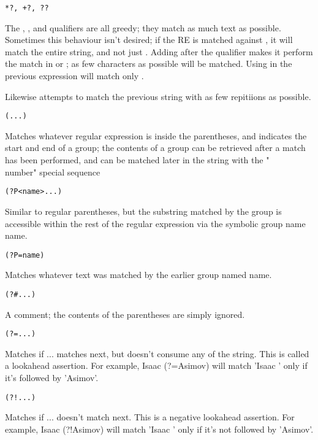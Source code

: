 \begin{lstlisting} 
*?, +?, ?? 
\end{lstlisting}
The , , and  qualifiers are all greedy; they match as much text as possible. Sometimes this behaviour isn’t desired; if the RE  is matched against , it will match the entire string, and not just . Adding  after the qualifier makes it perform the match in  or ; as few characters as possible will be matched. Using  in the previous expression will match only .

Likewise  attempts to match the previous string with as few repitiions as possible.

\begin{lstlisting}
(...)
\end{lstlisting}
Matches whatever regular expression is inside the parentheses, and indicates the start and end of a group; the contents of a group can be retrieved after a match has been performed, and can be matched later in the string with the "\\number" special sequence


\begin{lstlisting}
(?P<name>...)
\end{lstlisting}
Similar to regular parentheses, but the substring matched by the group is accessible within the rest of the regular expression via the symbolic group name name. 

\begin{lstlisting}
(?P=name)
\end{lstlisting}
Matches whatever text was matched by the earlier group named name.

\begin{lstlisting}
(?#...)
\end{lstlisting}
A comment; the contents of the parentheses are simply ignored.
\begin{lstlisting}
(?=...)
\end{lstlisting}
Matches if ... matches next, but doesn’t consume any of the string. This is called a lookahead assertion. For example, Isaac (?=Asimov) will match 'Isaac ' only if it’s followed by 'Asimov'.


\begin{lstlisting}
(?!...)
\end{lstlisting}
Matches if ... doesn’t match next. This is a negative lookahead assertion. For example, Isaac (?!Asimov) will match 'Isaac ' only if it’s not followed by 'Asimov'.

